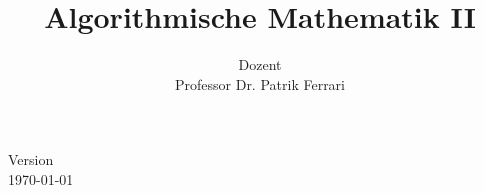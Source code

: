 \documentclass[a4paper,german]{article}
\title{Algorithmische Mathematik II}
\author{{\normalsize Dozent} \\ {\sc Professor Dr. Patrik Ferrari}}
\begin{document}
    \maketitle
    \vspace{3em}
    \centering \small Version \\
    \today\; \currenttime
    \vspace{10em}
    
    \newpage
    \tableofcontents
    \newpage
    
    
    
    
    
    
    \printindex
\end{document}
